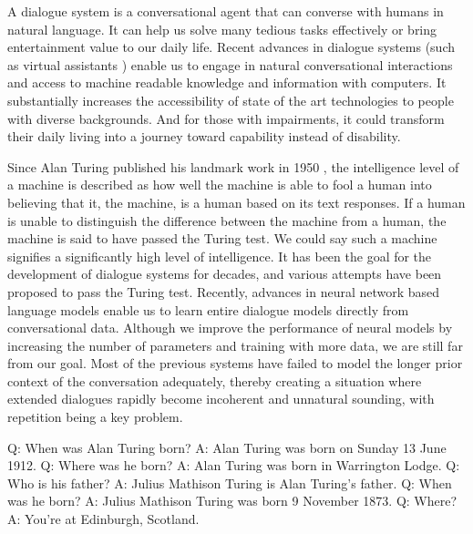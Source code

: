 \documentclass[bsc,frontabs,twoside,singlespacing,parskip,deptreport]{infthesis}     %
\begin{document}
A dialogue system is a conversational agent that can converse with humans in natural language. It can help us solve many tedious tasks effectively or bring entertainment value to our daily life. Recent advances in dialogue systems (such as virtual assistants \cite{alexa,cortana,siri}) enable us to engage in natural conversational interactions and access to machine readable knowledge and information with computers. It substantially increases the accessibility of state of the art technologies to people with diverse backgrounds. And for those with impairments, it could transform their daily living into a journey toward capability instead of disability.

Since Alan Turing published his landmark work in 1950 \cite{turing1950computing}, the intelligence level of a machine is described as how well the machine is able to fool a human into believing that it, the machine, is a human based on its text responses. If a human is unable to distinguish the difference between the machine from a human, the machine is said to have passed the Turing test. We could say such a machine signifies a significantly high level of intelligence. It has been the goal for the development of dialogue systems for decades, and various attempts have been proposed to pass the Turing test. Recently, advances in neural network based language models enable us to learn entire dialogue models directly from conversational data. Although we improve the performance of neural models by increasing the number of parameters and training with more data, we are still far from our goal. Most of the previous systems have failed to model the longer prior context of the conversation adequately, thereby creating a situation where extended dialogues rapidly become incoherent and unnatural sounding, with repetition being a key problem. 

\begin{exe}
	\ex
		\begin{xlist}
			\ex \label{q1} Q: When was Alan Turing born?
			\ex \label{a1} A: Alan Turing was born on Sunday 13 June 1912.
			\ex \label{q2} Q: Where was he born?
			\ex \label{a2} A: Alan Turing was born in Warrington Lodge.
			\ex \label{q3} Q: Who is his father?
			\ex \label{a3} A: Julius Mathison Turing is Alan Turing’s father.
			\ex \label{q4} Q: When was he born?
			\ex \label{a4} A: Julius Mathison Turing was born 9 November 1873.
			\ex \label{q5} Q: Where?
			\ex \label{a5} A: You’re at Edinburgh, Scotland.
	\end{xlist}
	\end{exe}
\end{document}

